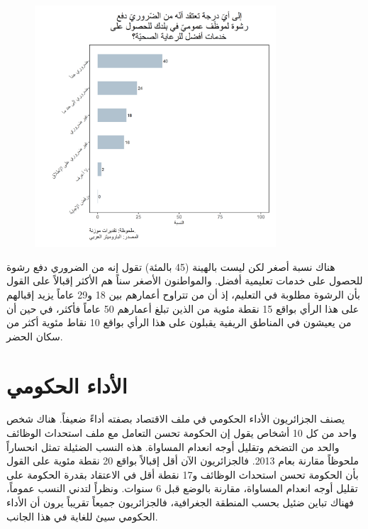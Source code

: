 \documentclass{article}
\begin{document}
	\begin{figure}[H]
	      \centering
				\includegraphics[width=9cm]{Q211c.png}
			\end{figure}
		

 هناك نسبة أصغر لكن ليست بالهينة (45 بالمئة) تقول إنه من الضروري دفع رشوة للحصول على خدمات تعليمية أفضل. والمواطنون الأصغر سناً هم الأكثر إقبالاً على القول بأن الرشوة مطلوبة في التعليم، إذ أن من تتراوح أعمارهم بين 18 و29 عاماً يزيد إقبالهم على هذا الرأي بواقع 15 نقطة مئوية من الذين تبلغ أعمارهم 50 عاماً فأكثر، في حين أن من يعيشون في المناطق الريفية يقبلون على هذا الرأي بواقع 10 نقاط مئوية أكثر من سكان الحضر.
	
\section*{الأداء الحكومي }
	
 يصنف الجزائريون الأداء الحكومي في ملف الاقتصاد بصفته أداءً ضعيفاً. هناك شخص واحد من كل 10 أشخاص يقول إن الحكومة تحسن التعامل مع ملف استحداث الوظائف والحد من التضخم وتقليل أوجه انعدام المساواة. هذه النسب الضئيلة تمثل انحساراً ملحوظاً مقارنة بعام 2013. فالجزائريون الآن أقل إقبالاً بواقع 20 نقطة مئوية على القول بأن الحكومة تحسن استحداث الوظائف و17 نقطة أقل في الاعتقاد بقدرة الحكومة على تقليل أوجه انعدام المساواة، مقارنة بالوضع قبل 6 سنوات. ونظراً لتدني النسب عموماً، فهناك تباين ضئيل بحسب المنطقة الجغرافية، فالجزائريون جميعاً تقريباً يرون أن الأداء الحكومي سيئ للغاية في هذا الجانب.
	
\end{document}
